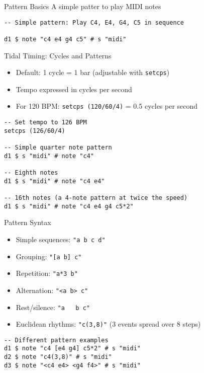 \documentclass{beamer}
\begin{document}
\begin{frame}[fragile]{Pattern Basics}
A simple patter to play MIDI notes
\begin{lstlisting}[style=tidal]
-- Simple pattern: Play C4, E4, G4, C5 in sequence

d1 $ note "c4 e4 g4 c5" # s "midi"
\end{lstlisting}
\end{frame}


\begin{frame}[fragile]{Tidal Timing: Cycles and Patterns}
\begin{itemize}
    \item Default: 1 cycle = 1 bar (adjustable with \texttt{setcps})
    \item Tempo expressed in cycles per second
    \item For 120 BPM: \texttt{setcps (120/60/4)} = 0.5 cycles per second
\end{itemize}

\begin{lstlisting}[style=tidal]
-- Set tempo to 126 BPM
setcps (126/60/4)

-- Simple quarter note pattern
d1 $ s "midi" # note "c4"

-- Eighth notes
d1 $ s "midi" # note "c4 e4"

-- 16th notes (a 4-note pattern at twice the speed)
d1 $ s "midi" # note "c4 e4 g4 c5*2"
\end{lstlisting}
\end{frame}


\begin{frame}[fragile]{Pattern Syntax}
\begin{itemize}
    \item Simple sequences: \texttt{"a b c d"}
    \item Grouping: \texttt{"[a b] c"}
    \item Repetition: \texttt{"a*3 b"}
    \item Alternation: \texttt{"<a b> c"}
    \item Rest/silence: \texttt{"a ~ b c"}
    \item Euclidean rhythms: \texttt{"c(3,8)"} (3 events spread over 8 steps)
\end{itemize}

\begin{lstlisting}[style=tidal]
-- Different pattern examples
d1 $ note "c4 [e4 g4] c5*2" # s "midi"
d2 $ note "c4(3,8)" # s "midi"
d3 $ note "<c4 e4> <g4 f4>" # s "midi"
\end{lstlisting}
\end{frame}
\end{document}
